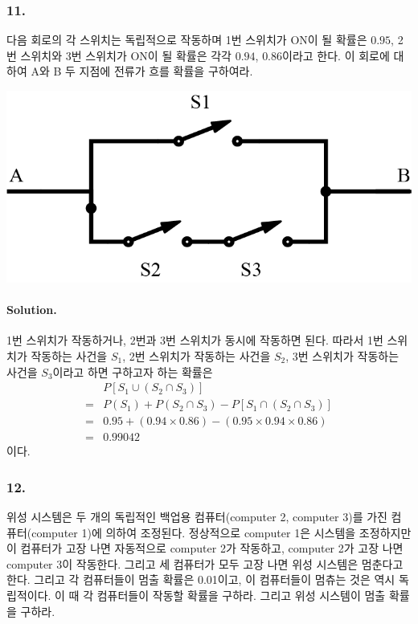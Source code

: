 \subsubsection{11.} 다음 회로의 각 스위치는 독립적으로 작동하며 1번 스위치가 ON이 될 확률은 $0.95$, 2번 스위치와 3번 스위치가 ON이 될 확률은 각각 $0.94$, $0.86$이라고 한다. 이 회로에 대하여 A와 B 두 지점에 전류가 흐를 확률을 구하여라.
\begin{center}
	\includegraphics[width=0.5\columnwidth]{hw/1-3-diagram.png}
\end{center}

\paragraph{Solution.} 1번 스위치가 작동하거나, 2번과 3번 스위치가 동시에 작동하면 된다. 따라서 1번 스위치가 작동하는 사건을 $S_1$, 2번 스위치가 작동하는 사건을 $S_2$, 3번 스위치가 작동하는 사건을 $S_3$이라고 하면 구하고자 하는 확률은
\begin{align*}
	& P\left[S_1 \cup \left(S_2 \cap S_3\right)\right]\\
	=& P\left(S_1\right) + P\left(S_2 \cap S_3\right) - P\left[S_1 \cap \left(S_2 \cap S_3\right)\right]\\
	=& 0.95 + \left(0.94 \times 0.86\right) - \left(0.95 \times 0.94 \times 0.86\right)\\
	=& 0.99042
\end{align*}
이다.

\subsubsection{12.} 위성 시스템은 두 개의 독립적인 백업용 컴퓨터(computer 2, computer 3)를 가진 컴퓨터(computer 1)에 의하여 조정된다. 정상적으로 computer 1은 시스템을 조정하지만 이 컴퓨터가 고장 나면 자동적으로 computer 2가 작동하고, computer 2가 고장 나면 computer 3이 작동한다. 그리고 세 컴퓨터가 모두 고장 나면 위성 시스템은 멈춘다고 한다. 그리고 각 컴퓨터들이 멈출 확률은 0.01이고, 이 컴퓨터들이 멈츄는 것은 역시 독립적이다. 이 때 각 컴퓨터들이 작동할 확률을 구하라. 그리고 위성 시스템이 멈출 확률을 구하라.

